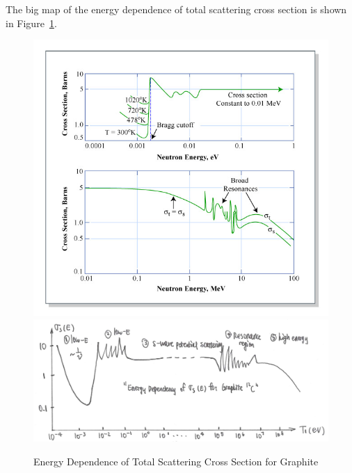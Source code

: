 \documentclass{school-22.101-notes}
\date{December 5, 2011}
\begin{document}
\maketitle

The big map of the energy dependence of total scattering cross section is shown in Figure~\ref{sigma-vs-T}.
\begin{figure}[ht]
    \centering
    \includegraphics[width=5in]{images/ni/sigma-vs-T.png}
    \includegraphics[width=5in]{images/ni/sigma-vs-T-2.png}
    \caption{Energy Dependence of Total Scattering Cross Section for Graphite\label{sigma-vs-T}}
\end{figure}
\end{document}
